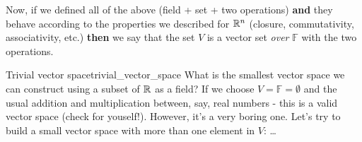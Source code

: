 Now, if we defined all of the above (field + set + two operations) \textbf{and} they behave according to the properties we described for $\Rs[n]$ (closure, commutativity, associativity, etc.) \textbf{then} we say that the set $V$ is a vector set \textit{over} $\mathbb{F}$ with the two operations.

\begin{example}{Trivial vector space}{trivial_vector_space}
    What is the smallest vector space we can construct using a subset of $\Rs$ as a field? If we choose $V=\mathbb{F}=\emptyset$ and the usual addition and multiplication between, say, real numbers - this is a valid vector space (check for youself!). However, it's a very boring one. Let's try to build a small vector space with more than one element in $V$: \ldots
\end{example}
